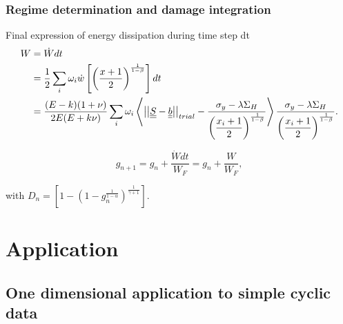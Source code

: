 \documentclass[xcolor=table]{Bredelebeamer}
\begin{document}
\begin{frame}
	\frametitle{Regime determination and damage integration}
	\begin{block}{Final expression of energy dissipation during time step dt }	
	\begin{equation}
	\begin{split}
	W&=\dot{W}dt
	\\&=\frac{1}{2}\sum_{i}\omega_i\dot{w}\left[  \left( \frac{x+1}{2}\right) ^{\frac{1}{1-\beta}}\right]dt
	\\&=\dfrac{(E-k)(1+\nu) }{2E(E+k\nu)}\sum_{i}\omega_i\left\langle  \left| \left|\uline{\uline{S}}-\uline{\uline{b}}\right| \right|_{trial}-\dfrac{\sigma_y-\lambda \Sigma_H}{\left( \dfrac{x_i+1}{2}\right) ^{\frac{1}{1-\beta}}}\right\rangle \dfrac{\sigma_y-\lambda \Sigma_H}{\left( \dfrac{x_i+1}{2}\right) ^{\frac{1}{1-\beta}}}.
	\end{split}
	\label{finaldw}
	\end{equation}
	\end{block}

$$g_{n+1}=g_n+\dfrac{\dot{W}dt}{W_F}=g_n+\dfrac{W}{W_F},$$

with $D_n=\left[1-\left(1-g_n^{\frac{1}{1-\alpha}} \right)^{\frac{1}{\gamma+1}}  \right] $.

\end{frame}	

\section{Application}
\subsection{One dimensional application to simple cyclic data}
\end{document}
